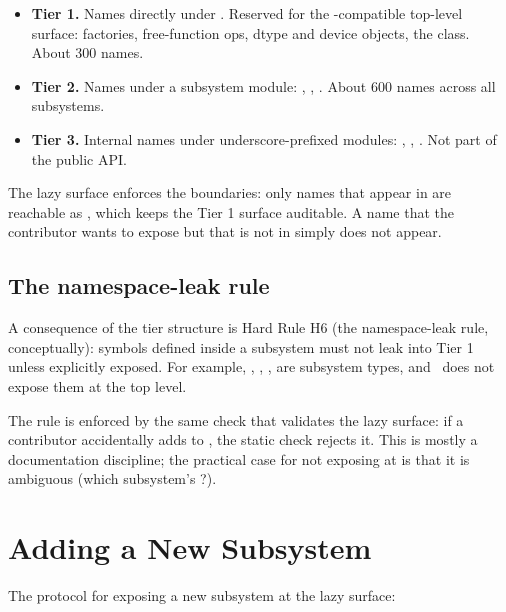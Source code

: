 \begin{itemize}
  \item \textbf{Tier 1.} Names directly under .
    Reserved for the -compatible top-level surface:
    factories, free-function ops, dtype and device objects, the
     class. About 300 names.
  \item \textbf{Tier 2.} Names under a subsystem module:
    , ,
    . About 600 names across all
    subsystems.
  \item \textbf{Tier 3.} Internal names under underscore-prefixed
    modules: , ,
    . Not part of the public API.
\end{itemize}

The lazy surface enforces the boundaries: only names that appear
in  are reachable as ,
which keeps the Tier 1 surface auditable. A name that the
contributor wants to expose but that is not in
 simply does not appear.

\subsection{The namespace-leak rule}
\label{ssec:lazy_imports:no_leak}

A consequence of the tier structure is Hard Rule H6 (the
namespace-leak rule, conceptually): symbols defined inside a
subsystem must not leak into Tier 1 unless explicitly exposed. For
example, , , ,
 are subsystem types, and \Lucid\ does not expose
them at the top level.

The rule is enforced by the same check that validates the lazy
surface: if a contributor accidentally adds  to
, the static check rejects it. This is
mostly a documentation discipline; the practical case for not
exposing  at  is that it is
ambiguous (which subsystem's ?).

\section{Adding a New Subsystem}
\label{sec:lazy_imports:adding}

The protocol for exposing a new subsystem at the lazy surface:

